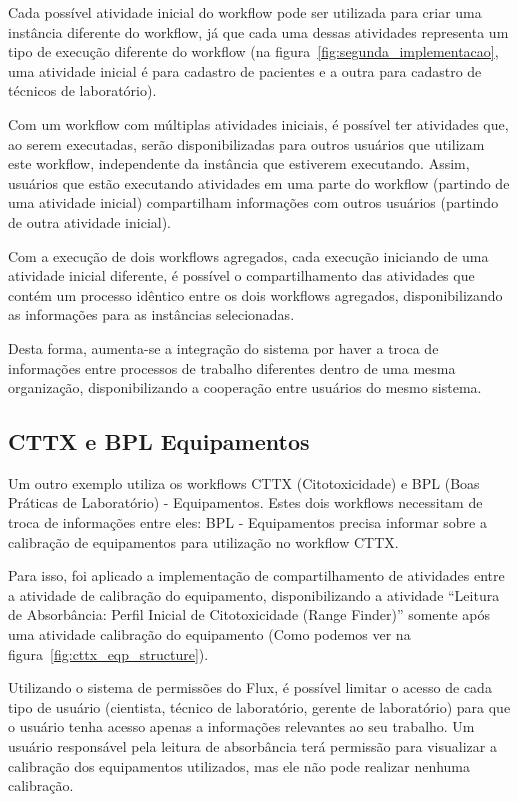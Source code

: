Cada possível atividade inicial do workflow pode ser utilizada para criar uma instância diferente do workflow, já que cada uma dessas atividades representa um tipo de execução diferente do workflow (na figura~\ref{fig:segunda_implementacao}, uma atividade inicial é para cadastro de pacientes e a outra para cadastro de técnicos de laboratório).

Com um workflow com múltiplas atividades iniciais, é possível ter atividades que, ao serem executadas, serão disponibilizadas para outros usuários que utilizam este workflow, independente da instância que estiverem executando. Assim, usuários que estão executando atividades em uma parte do workflow (partindo de uma atividade inicial) compartilham informações com outros usuários (partindo de outra atividade inicial).

Com a execução de dois workflows agregados, cada execução iniciando de uma atividade inicial diferente, é possível o compartilhamento das atividades que contém um processo idêntico entre os dois workflows agregados, disponibilizando as informações para as instâncias selecionadas.

Desta forma, aumenta-se a integração do sistema por haver a troca de informações entre processos de trabalho diferentes dentro de uma mesma organização, disponibilizando a cooperação entre usuários do mesmo sistema.


\subsection{CTTX e BPL Equipamentos} \label{sec:cttx_bpl}

Um outro exemplo utiliza os workflows CTTX (Citotoxicidade) e BPL (Boas Práticas de Laboratório) - Equipamentos. Estes dois workflows necessitam de troca de informações entre eles: BPL - Equipamentos precisa informar sobre a calibração de equipamentos para utilização no workflow CTTX.

Para isso, foi aplicado a implementação de compartilhamento de atividades entre a atividade de calibração do equipamento, disponibilizando a atividade ``Leitura de Absorbância: Perfil Inicial de Citotoxicidade (Range Finder)'' somente após uma atividade calibração do equipamento (Como podemos ver na figura~\ref{fig:cttx_eqp_structure}).

Utilizando o sistema de permissões do Flux, é possível limitar o acesso de cada tipo de usuário (cientista, técnico de laboratório, gerente de laboratório) para que o usuário tenha acesso apenas a informações relevantes ao seu trabalho. Um usuário responsável pela leitura de absorbância terá permissão para visualizar a calibração dos equipamentos utilizados, mas ele não pode realizar nenhuma calibração.

